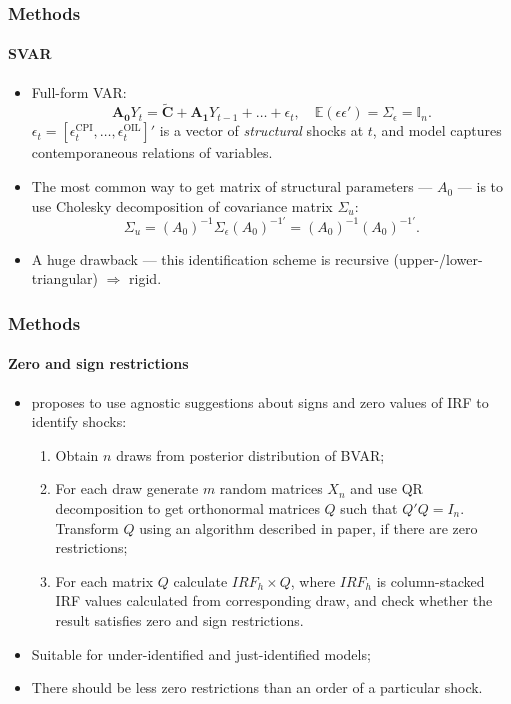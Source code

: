 \documentclass{beamer}
\begin{document}
\begin{frame}
		\frametitle{Methods}
	\framesubtitle{SVAR}
	\begin{itemize}
		\item Full-form VAR:
		\begin{equation}
			\mathbf{A_0}{Y}_t = \tilde{\mathbf{C}} + \mathbf{A_1} Y_{t-1} + \ldots + \epsilon_t, \quad \mathbb{E}(\epsilon \epsilon') = \Sigma_\epsilon = \mathbb{I}_n.
		\end{equation}
		$\epsilon_t = \left[\epsilon^{\text{CPI}}_t, \ldots, \epsilon^{\text{OIL}}_t\right]'$ is a vector of \textit{structural} shocks at $t$, and model captures contemporaneous relations of variables.
		\item The most common way to get matrix of structural parameters --- $A_0$ --- is to use Cholesky decomposition of covariance matrix $\Sigma_u$:
		\begin{equation}
			\Sigma_u = (A_0)^{-1} \Sigma_\epsilon (A_0)^{-1'} = (A_0)^{-1} (A_0)^{-1'}.
		\end{equation}
		\item A huge drawback --- this identification scheme is recursive (upper-/lower-triangular) $\Rightarrow$ rigid.
	\end{itemize}
\end{frame}

\begin{frame}
	\frametitle{Methods}
	\framesubtitle{Zero and sign restrictions}
	\begin{itemize}
	\item \parencite{Arias2014} proposes to use agnostic suggestions about signs and zero values of IRF to identify shocks:
	\begin{enumerate}
		\item Obtain $n$ draws from posterior distribution of BVAR;
		\item For each draw generate $m$ random matrices $X_n$ and use QR decomposition to get orthonormal matrices $Q$ such that $Q'Q = I_n$. Transform $Q$ using an algorithm described in paper, if there are zero restrictions;
		\item For each matrix $Q$ calculate $IRF_h \times Q$, where $IRF_h$ is column-stacked IRF values calculated from corresponding draw, and check whether the result satisfies zero and sign restrictions. 
	\end{enumerate}
	\item Suitable for under-identified and just-identified models;
	\item There should be less zero restrictions than an order of a particular shock.
	\end{itemize}
\end{frame}
\end{document}
